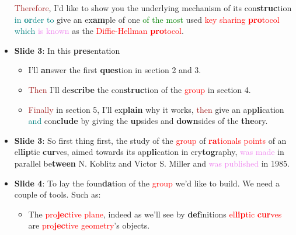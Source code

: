 \begin{itemize}
            \textcolor{brown}{Therefore}, I'd like to show you the underlying
            mechanism of its con\textbf{struc}tion \textcolor{teal}{in \textbf{or}der to} give an ex\textbf{am}ple of one
            \textcolor{green}{of the most} used
            \textcolor{red}{key
            sharing \textbf{pro}tocol} \textcolor{teal}{which} \textcolor{violet}{is known} as the \textcolor{red}{Diffie-Hellman
                \textbf{pro}tocol}. 
        \item \textbf{Slide 3}:
            In this \textbf{pres}entation
            \begin{itemize}
                \item I'll \textbf{an}swer the first \textbf{ques}tion in
                    section 2 and 3.
                \item \textcolor{brown}{Then} I'll de\textbf{scribe} the con\textbf{struc}tion of the \textcolor{red}{group} in section 4.
                \item \textcolor{brown}{Finally} in section 5, I'll ex\textbf{plain} why it
                    works, \textcolor{brown}{then} give an
                    ap\textbf{pli}cation \textcolor{teal}{and} con\textbf{clude} by giving the \textbf{up}sides and \textbf{down}sides of the
                    \textbf{the}ory.
            \end{itemize}
        \item \textbf{Slide 3}: So first thing first, the study of the  \textcolor{red}{group} of
            \textcolor{red}{\textbf{rat}ionals points} of an
            el\textbf{lip}tic \textbf{cur}ves, aimed towards its ap\textbf{pli}cation in cry\textbf{tog}raphy, \textcolor{violet}{was
                made} in
            parallel be\textbf{tween} N. Koblitz and Victor S. Miller and \textcolor{violet}{was
                published} in 1985.
        \item \textbf{Slide 4}: To lay the foun\textbf{da}tion of the \textcolor{red}{group} we'd like to
            build. We need a couple of tools.
            Such as:
            \begin{itemize}
                \item The \textcolor{red}{pro\textbf{jec}tive plane},
                    indeed as we'll see by \textbf{def}initions \textcolor{red}{el\textbf{lip}tic \textbf{cur}ves} are
                    \textcolor{red}{pro\textbf{jec}tive
                    geometry}'s objects.

\end{itemize}
\end{itemize}
